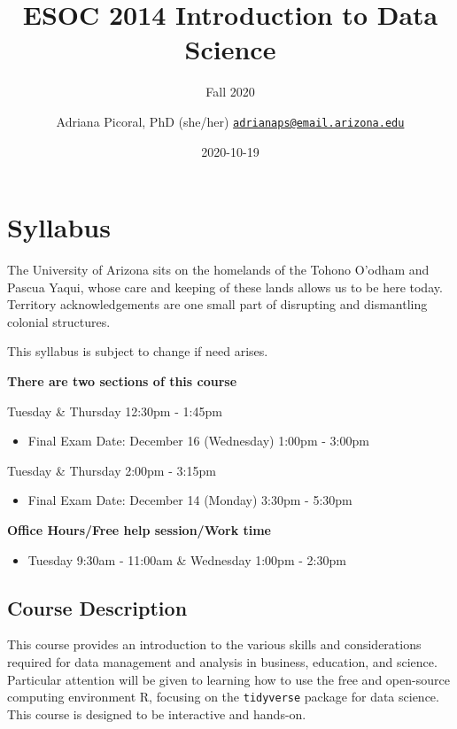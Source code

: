 \documentclass[
]{book}
\title{ESOC 2014 Introduction to Data Science}
\subtitle{Fall 2020}
\author{Adriana Picoral, PhD (she/her) \href{mailto:adrianaps@email.arizona.edu}{\nolinkurl{adrianaps@email.arizona.edu}}}
\date{2020-10-19}
\providecommand{\tightlist}{%
  \setlength{\itemsep}{0pt}\setlength{\parskip}{0pt}}
\begin{document}
\maketitle

{
\setcounter{tocdepth}{1}
\tableofcontents
}
\hypertarget{syllabus}{%
\chapter{Syllabus}\label{syllabus}}

The University of Arizona sits on the homelands of the Tohono O'odham and Pascua Yaqui, whose care and keeping of these lands allows us to be here today. Territory acknowledgements are one small part of disrupting and dismantling colonial structures.

This syllabus is subject to change if need arises.

\textbf{There are two sections of this course}

Tuesday \& Thursday 12:30pm - 1:45pm

\begin{itemize}
\tightlist
\item
  Final Exam Date: December 16 (Wednesday) 1:00pm - 3:00pm
\end{itemize}

Tuesday \& Thursday 2:00pm - 3:15pm

\begin{itemize}
\tightlist
\item
  Final Exam Date: December 14 (Monday) 3:30pm - 5:30pm
\end{itemize}

\textbf{Office Hours/Free help session/Work time}

\begin{itemize}
\tightlist
\item
  Tuesday 9:30am - 11:00am \& Wednesday 1:00pm - 2:30pm
\end{itemize}

\hypertarget{course-description}{%
\section{Course Description}\label{course-description}}

This course provides an introduction to the various skills and considerations required for data management and analysis in business, education, and science. Particular attention will be given to learning how to use the free and open-source computing environment R, focusing on the \texttt{tidyverse} package for data science. This course is designed to be interactive and hands-on.
\end{document}
